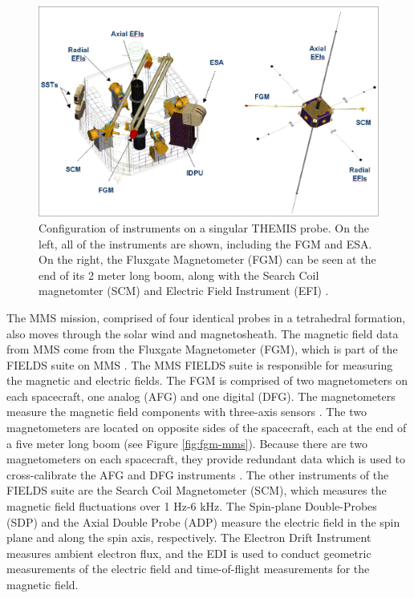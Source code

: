 \begin{figure}
    \centering
    \includegraphics[width=\textwidth]{Figures/Instrumentation/THM_diagram.jpeg}
    \caption[Configuration of instruments on a singular THEMIS probe]{Configuration of instruments on a singular THEMIS probe. On the left, all of the instruments are shown, including the FGM and ESA. On the right, the Fluxgate Magnetometer (FGM) can be seen at the end of its 2 meter long boom, along with the Search Coil magnetomter (SCM) and Electric Field Instrument (EFI) \citep{eoPortal}.}
    \label{fig:thm-diagram}
\end{figure}

The MMS mission, comprised of four identical probes in a tetrahedral formation, also moves through the solar wind and magnetosheath. The magnetic field data from MMS come from the Fluxgate Magnetometer (FGM), which is part of the FIELDS suite on MMS \citep{Torbert:2016}. The MMS FIELDS suite is responsible for measuring the magnetic and electric fields. The FGM is comprised of two magnetometers on each spacecraft, one analog (AFG) and one digital (DFG). The magnetometers measure the magnetic field components with three-axis sensors \citep{Torbert:2016}. The two magnetometers are located on opposite sides of the spacecraft, each at the end of a five meter long boom (see Figure \ref{fig:fgm-mms}). Because there are two magnetometers on each spacecraft, they provide redundant data which is used to cross-calibrate the AFG and DFG instruments \citep{Torbert:2016}. The other instruments of the FIELDS suite are the Search Coil Magnetometer (SCM), which measures the magnetic field fluctuations over 1 Hz-6 kHz. The Spin-plane Double-Probes (SDP) and the Axial Double Probe (ADP) measure the electric field in the spin plane and along the spin axis, respectively. The Electron Drift Instrument measures ambient electron flux, and the EDI is used to conduct geometric measurements of the electric field and time-of-flight measurements for the magnetic field.

